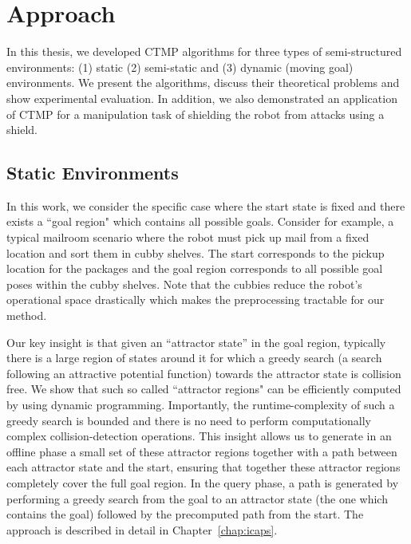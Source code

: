 \documentclass[a4paper]{report}
\begin{document}
\section{Approach}
\label{sec:approach}
In this thesis, we developed CTMP algorithms for three types of semi-structured environments: (1) static (2) semi-static and (3) dynamic (moving goal) environments. We present the algorithms, discuss their theoretical problems and show experimental evaluation. In addition, we also demonstrated an application of CTMP for a manipulation task of shielding the robot from attacks using a shield.

\subsection{Static Environments}
In this work, we consider the specific case where the start state is fixed and there exists a ``goal region" which contains all possible goals. Consider for example, a typical mailroom scenario where the robot must pick up mail from a fixed location and sort them in cubby shelves. The start corresponds to the pickup location for the packages and the goal region corresponds to all possible goal poses within the cubby shelves. Note that the cubbies reduce the robot's operational space drastically which makes the preprocessing tractable for our method.

Our key insight is that given an ``attractor state'' in the goal region, typically there is a large region of states around it for which a greedy search (a search following an attractive potential function) towards the attractor state is collision free. We show that such so called ``attractor regions" can be efficiently computed by using dynamic programming.
Importantly, the runtime-complexity of such a greedy search is bounded and there is no need to perform computationally complex collision-detection operations. 
This insight allows us to generate in an offline phase a small set of these attractor regions together with a path between each attractor state and the start, ensuring that together these attractor regions completely cover the full goal region.
In the query phase, a path is generated by performing a greedy search from the goal to an attractor state (the one which contains the goal) followed by the precomputed path from the start. The approach is described in detail in Chapter~\ref{chap:icaps}.
\end{document}
